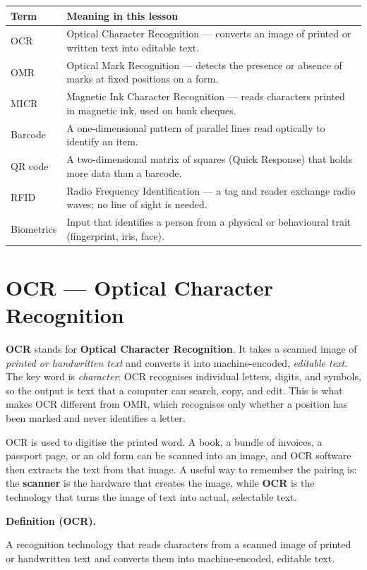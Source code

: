 \documentclass[11pt]{article}
\newenvironment{definitionbox}[1]{%
  \par\noindent\textbf{Definition (#1).}\ \itshape
}{\par\vspace{0.3em}}
\begin{document}
\begin{center}
\begin{tabular}{p{}p{}}
\toprule
\textbf{Term} & \textbf{Meaning in this lesson} \\
\midrule
OCR & Optical Character Recognition --- converts an image of printed or written text into editable text. \\
OMR & Optical Mark Recognition --- detects the presence or absence of marks at fixed positions on a form. \\
MICR & Magnetic Ink Character Recognition --- reads characters printed in magnetic ink, used on bank cheques. \\
Barcode & A one-dimensional pattern of parallel lines read optically to identify an item. \\
QR code & A two-dimensional matrix of squares (Quick Response) that holds more data than a barcode. \\
RFID & Radio Frequency Identification --- a tag and reader exchange radio waves; no line of sight is needed. \\
Biometrics & Input that identifies a person from a physical or behavioural trait (fingerprint, iris, face). \\
\bottomrule
\end{tabular}
\end{center}

\section{OCR --- Optical Character Recognition}
\textbf{OCR} stands for \textbf{Optical Character Recognition}. It takes a
scanned image of \emph{printed or handwritten text} and converts it into
machine-encoded, \emph{editable text}. The key word is
\emph{character}: OCR recognises individual letters, digits, and symbols, so
the output is text that a computer can search, copy, and edit. This is what
makes OCR different from OMR, which recognises only whether a position has
been marked and never identifies a letter.

OCR is used to digitise the printed word. A book, a bundle of invoices, a
passport page, or an old form can be scanned into an image, and OCR software
then extracts the text from that image. A useful way to remember the pairing
is: the \textbf{scanner} is the hardware that creates the image, while
\textbf{OCR} is the technology that turns the image of text into actual,
selectable text.

\begin{definitionbox}{OCR}
A recognition technology that reads characters from a scanned image of
printed or handwritten text and converts them into machine-encoded,
editable text.
\end{definitionbox}
\end{document}
